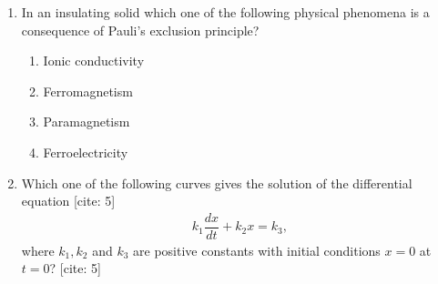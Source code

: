 \documentclass[14pt, a4paper]{extarticle}
\begin{document}
\begin{enumerate}[label=\textbf{Q. \arabic*}]
\item In an insulating solid which one of the following physical phenomena is a consequence of Pauli's exclusion principle?
    \begin{enumerate}[label=(\Alph*)]
        \item Ionic conductivity
        \item Ferromagnetism
        \item Paramagnetism
        \item Ferroelectricity
    \end{enumerate}

\item Which one of the following curves gives the solution of the differential equation [cite: 5]
    \begin{align*} k_1\dfrac{dx}{dt} + k_2x = k_3, \end{align*}
    where $k_1, k_2$ and $k_3$ are positive constants with initial conditions $x=0$ at $t=0$? [cite: 5]
    \begin{enumerate}[label=(\Alph*)]
\end{enumerate}
\end{enumerate}
\end{document}
